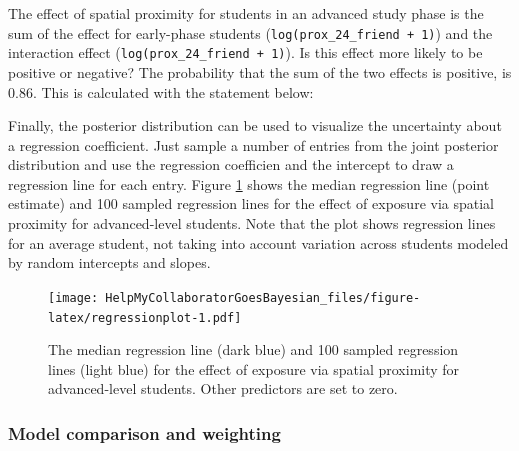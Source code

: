 \documentclass[
  english,
  doc]{apa6}
\newenvironment{Shaded}{\begin{snugshade}}{\end{snugshade}}
\newcommand{\DataTypeTok}[1]{\textcolor[rgb]{0.13,0.29,0.53}{#1}}
\newcommand{\DecValTok}[1]{\textcolor[rgb]{0.00,0.00,0.81}{#1}}
\newcommand{\KeywordTok}[1]{\textcolor[rgb]{0.13,0.29,0.53}{\textbf{#1}}}
\newcommand{\NormalTok}[1]{#1}
\newcommand{\OperatorTok}[1]{\textcolor[rgb]{0.81,0.36,0.00}{\textbf{#1}}}
\newcommand{\StringTok}[1]{\textcolor[rgb]{0.31,0.60,0.02}{#1}}
\begin{document}
The effect of spatial proximity for students in an advanced study phase is the sum of the effect for early-phase students (\texttt{log(prox\_24\_friend\ +\ 1)}) and the interaction effect (\texttt{log(prox\_24\_friend\ +\ 1)}). Is this effect more likely to be positive or negative? The probability that the sum of the two effects is positive, is 0.86. This is calculated with the statement below:

\begin{Shaded}
\end{Shaded}

Finally, the posterior distribution can be used to visualize the uncertainty about a regression coefficient. Just sample a number of entries from the joint posterior distribution and use the regression coefficien and the intercept to draw a regression line for each entry. Figure \ref{fig:regressionplot} shows the median regression line (point estimate) and 100 sampled regression lines for the effect of exposure via spatial proximity for advanced-level students. Note that the plot shows regression lines for an average student, not taking into account variation across students modeled by random intercepts and slopes.

\begin{figure}
\centering
\texttt{[image: HelpMyCollaboratorGoesBayesian\_files/figure-latex/regressionplot-1.pdf]}
\caption{\label{fig:regressionplot}The median regression line (dark blue) and 100 sampled regression lines (light blue) for the effect of exposure via spatial proximity for advanced-level students. Other predictors are set to zero.}
\end{figure}

\hypertarget{model-comparison-and-weighting}{%
\subsubsection{Model comparison and weighting}\label{model-comparison-and-weighting}}
\end{document}

